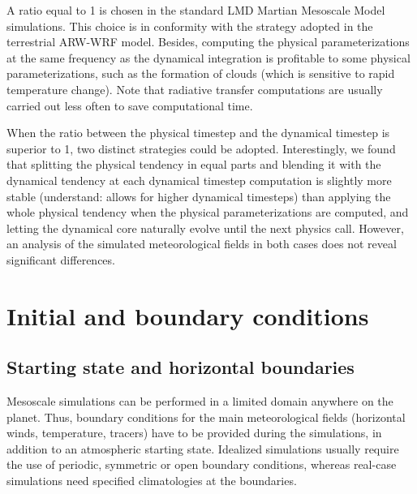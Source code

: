 \sk
A ratio equal to 1 is chosen in the standard LMD Martian Mesoscale Model simulations. This choice is in conformity with the strategy adopted in the terrestrial ARW-WRF model. Besides, computing the physical parameterizations at the same frequency as the dynamical integration is profitable to some physical parameterizations, such as the formation of clouds (which is sensitive to rapid temperature change). Note that radiative transfer computations are usually carried out less often to save computational time.

\sk
When the ratio between the physical timestep and the dynamical timestep is superior to 1, two distinct strategies could be adopted. Interestingly, we found that splitting the physical tendency in equal parts and blending it with the dynamical tendency at each dynamical timestep computation is slightly more stable (understand: allows for higher dynamical timesteps) than applying the whole physical tendency when the physical parameterizations are computed, and letting the dynamical core naturally evolve until the next physics call. However, an analysis of the simulated meteorological fields in both cases does not reveal significant differences.

\mk
\section{Initial and boundary conditions}
\label{ssc:inibdy}

\mk
\subsection{Starting state and horizontal boundaries}

\sk
Mesoscale simulations can be performed in a limited domain anywhere on the planet. Thus, boundary conditions for the main meteorological fields (horizontal winds, temperature, tracers) have to be provided during the simulations, in addition to an atmospheric starting state. Idealized simulations usually require the use of periodic, symmetric or open boundary conditions, whereas real-case simulations need specified climatologies at the boundaries.


